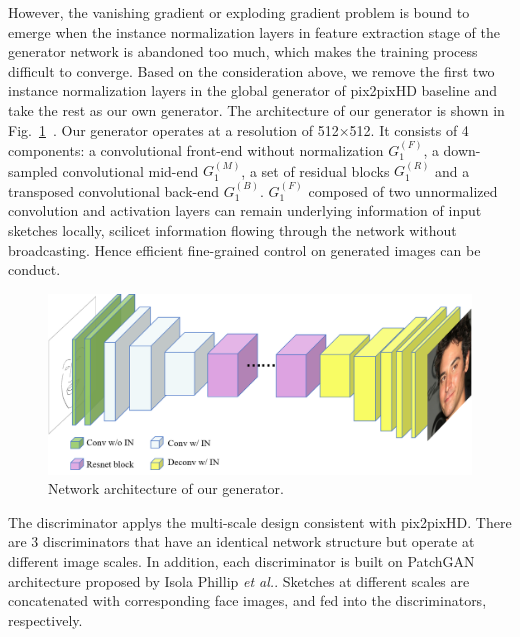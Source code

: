\documentclass[10pt,twocolumn,letterpaper]{article}
\begin{document}
However, the vanishing gradient or exploding gradient problem is bound to emerge when the instance normalization layers in feature extraction stage of the generator network is abandoned too much, which makes the training process difficult to converge. Based on the consideration above, we remove the first two instance normalization layers in the global generator of pix2pixHD baseline and take the rest as our own generator. The architecture of our generator is shown in Fig.~\ref{fig:our_generator}~. Our generator operates at a resolution of 512×512. It consists of 4 components: a convolutional front-end without normalization $G_1^{(F)}$, a down-sampled convolutional mid-end $G_1^{(M)}$, a set of residual blocks $G_1^{(R)}$ and a transposed convolutional back-end $G_1^{(B)}$. $G_1^{(F)}$ composed of two unnormalized convolution and activation layers can remain underlying information of input sketches locally, scilicet information flowing through the network without broadcasting. Hence efficient fine-grained control on generated images can be conduct. %
\begin{figure}[htbp]
	\centering
	\includegraphics[width=0.8 \textwidth]{our_model_G.png}
	\caption{Network architecture of our generator. }
	\label{fig:our_generator}
\end{figure}

The discriminator applys the multi-scale design consistent with pix2pixHD. There are 3 discriminators that have an identical network structure but operate at different image scales. In addition, each discriminator is built on PatchGAN architecture proposed by Isola Phillip \textit{et al.}\cite{pix2pix}. Sketches at different scales are concatenated with corresponding face images, and fed into the discriminators, respectively. 
\end{document}

